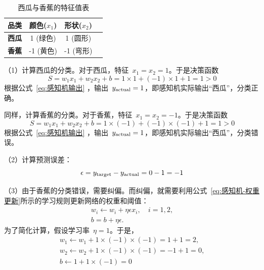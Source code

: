 \begin{table}[htbp]
\centering
\caption{西瓜与香蕉的特征值表}
\begin{tabular}{|c|c|c|c|
}
\hline
{\bf 品类} & {\bf  颜色($x_1$) } & {\bf 形状($x_2$)}  \\
\hline
{\bf 西瓜} &  1 (绿色)  &  1 (圆形)   \\
\hline
{\bf 香蕉}  &  -1 (黄色) & -1 (弯形)  \\
\hline
\end{tabular}
\label{西瓜与香蕉的特征值表}
\end{table}

%
 

 （1）计算西瓜的分类。对于西瓜，特征~$x_1 =x_2=1$。于是决策函数
$$
S  = w_1 x_1 +w_2 x_2  +b   = 1\times 1 + (-1)\times 1 + 1 = 1 >0
$$
根据公式~\eqref{eq:感知机输出} ，输出~$y_{\rm actual}=1$，即感知机实际输出“西瓜”，分类正确。

同样，计算香蕉的分类。对于香蕉，特征~$x_1 =x_2=-1$。于是决策函数
$$
S  = w_1 x_1 +w_2 x_2  +b   = 1\times (-1) + (-1)\times (-1) + 1 = 1 >0
$$
根据公式~\eqref{eq:感知机输出} ，输出~$y_{\rm actual}=1$，即感知机实际输出“西瓜”，分类错误。

（2）计算预测误差：
$$ \epsilon = y_{\rm target}- y_{\rm actual}  =0 -1=-1 $$

（3）由于香蕉的分类错误，需要纠偏。而纠偏，就需要利用公式~\eqref{eq:感知机-权重更新}所示的学习规则更新网络的权重和阈值：
$$\begin{array}{l}
 w_i  \leftarrow w_i +\eta \epsilon x_i, \quad  i=1,2, \\
  b = b+\eta \epsilon .
\end{array}
$$
为了简化计算，假设学习率~$\eta =1$。于是， 
\begin{eqnarray*}
w_1  \leftarrow w_1 +1\times (-1)\times  (-1) = 1 +1 =2, \\
w_2  \leftarrow w_2 +1\times (-1) \times   (-1) = -1+ 1 = 0, \\
b  \leftarrow 1+1 \times (-1) = 0
\end{eqnarray*}


